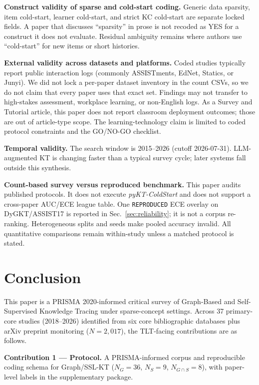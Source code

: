 \documentclass[lettersize,journal]{IEEEtran}
\begin{document}
\textbf{Construct validity of sparse and cold-start coding.} Generic data sparsity, item cold-start, learner cold-start, and strict KC cold-start are separate locked fields. A paper that discusses ``sparsity'' in prose is not recoded as YES for a construct it does not evaluate. Residual ambiguity remains where authors use ``cold-start'' for new items or short histories.

\textbf{External validity across datasets and platforms.} Coded studies typically report public interaction logs (commonly ASSISTments, EdNet, Statics, or Junyi). We did not lock a per-paper dataset inventory in the count CSVs, so we do not claim that every paper uses that exact set. Findings may not transfer to high-stakes assessment, workplace learning, or non-English logs. As a Survey and Tutorial article, this paper does not report classroom deployment outcomes; those are out of article-type scope. The learning-technology claim is limited to coded protocol constraints and the GO/NO-GO checklist.

\textbf{Temporal validity.} The search window is 2015--2026 (cutoff 2026-07-31). LLM-augmented KT is changing faster than a typical survey cycle; later systems fall outside this synthesis.

\textbf{Count-based survey versus reproduced benchmark.} This paper audits published protocols. It does not execute \emph{pyKT-ColdStart} and does not support a cross-paper AUC/ECE league table. One \texttt{REPRODUCED} ECE overlay on DyGKT/ASSIST17 is reported in Sec.~\ref{sec:reliability}; it is not a corpus re-ranking. Heterogeneous splits and seeds make pooled accuracy invalid. All quantitative comparisons remain within-study unless a matched protocol is stated.

\section{Conclusion}
\label{sec:conclusion}

This paper is a PRISMA 2020-informed critical survey of Graph-Based and Self-Supervised Knowledge Tracing under sparse-concept settings. Across 37 primary-core studies (2018--2026) identified from six core bibliographic databases plus arXiv preprint monitoring ($N = 2,017$), the TLT-facing contributions are as follows.

\textbf{Contribution 1 --- Protocol.} A PRISMA-informed corpus and reproducible coding schema for Graph/SSL-KT ($N_G=36$, $N_S=9$, $N_{G \cap S}=8$), with paper-level labels in the supplementary package.
\end{document}
